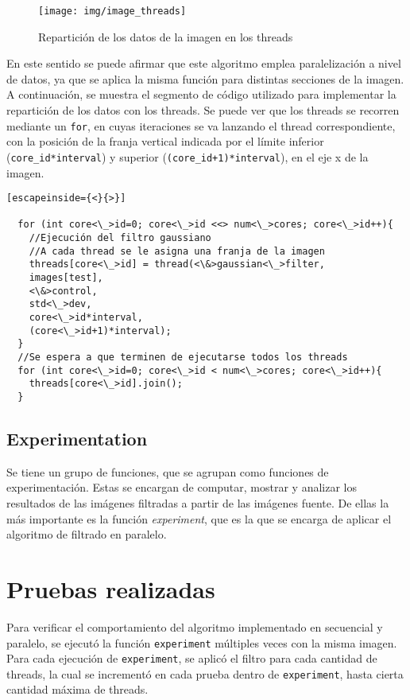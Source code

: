 \documentclass {article}
\begin{document}
\begin{figure}[ht]
  \centering
  \texttt{[image: img/image\_threads]}
  \caption{\label{fig:image_threads}Repartición de los datos de la imagen en los threads}
\end{figure}

En este sentido se puede afirmar que este algoritmo emplea paralelización a nivel de datos, ya que
se aplica la misma función para distintas secciones de la imagen. A continuación, se muestra el
segmento de código utilizado para implementar la repartición de los datos con los threads. Se puede
ver que los threads se recorren mediante un \texttt{for}, en cuyas iteraciones se va lanzando el
thread correspondiente, con la posición de la franja vertical indicada por el límite inferior
(\texttt{core\_id*interval}) y superior (\texttt{(core\_id+1)*interval}), en el eje x de la imagen.

\begin{lstlisting}[escapeinside={<}{>}]
  
  for (int core<\_>id=0; core<\_>id <<> num<\_>cores; core<\_>id++){
    //Ejecución del filtro gaussiano
    //A cada thread se le asigna una franja de la imagen
    threads[core<\_>id] = thread(<\&>gaussian<\_>filter,
    images[test],
    <\&>control,
    std<\_>dev,
    core<\_>id*interval,
    (core<\_>id+1)*interval);
  }
  //Se espera a que terminen de ejecutarse todos los threads
  for (int core<\_>id=0; core<\_>id < num<\_>cores; core<\_>id++){
    threads[core<\_>id].join();
  }

\end{lstlisting}


\subsection{Experimentation}

Se tiene un grupo de funciones, que se agrupan como funciones de experimentación. Estas se encargan
de computar, mostrar y analizar los resultados de las imágenes filtradas a partir de las imágenes
fuente. De ellas la más importante es la función \textit{experiment}, que es la que se encarga de
aplicar el algoritmo de filtrado en paralelo.


\section{Pruebas realizadas}
\label{sec:pruebas}
Para verificar el comportamiento del algoritmo implementado en secuencial y paralelo, se ejecutó la
función \texttt{experiment} múltiples veces con la misma imagen. Para cada ejecución de
\texttt{experiment}, se aplicó el filtro para cada cantidad de threads, la cual se incrementó en
cada prueba dentro de \texttt{experiment}, hasta cierta cantidad máxima de threads.
\end{document}
